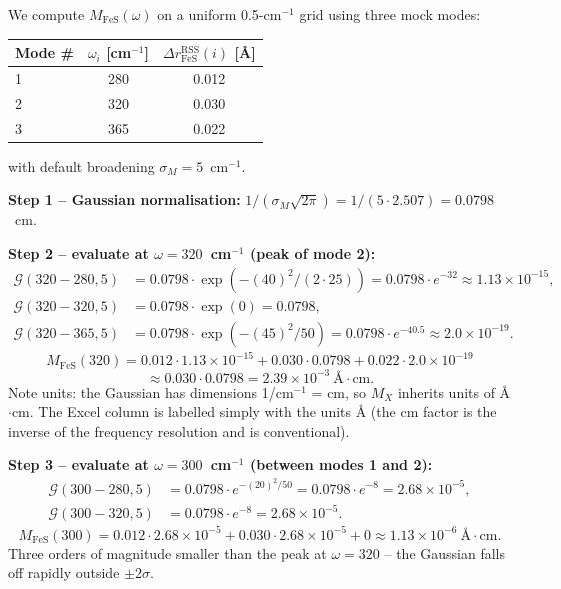 \documentclass[10pt,a4paper,twoside]{article}
\begin{document}
\begin{workedexample}
We compute $M_\text{FeS}(\omega)$ on a uniform 0.5-cm$^{-1}$ grid
using three mock modes:
\begin{center}
\begin{tabular}{lcc}
\toprule
Mode \# & $\omega_i$ [cm$^{-1}$] & $\Delta r^\text{RSS}_\text{FeS}(i)$ [\AA{}] \\
\midrule
1 & 280 & 0.012 \\
2 & 320 & 0.030 \\
3 & 365 & 0.022 \\
\bottomrule
\end{tabular}
\end{center}
with default broadening $\sigma_M = 5$~cm$^{-1}$.

\textbf{Step 1 -- Gaussian normalisation:}
$1/(\sigma_M \sqrt{2\pi}) = 1/(5 \cdot 2.507) = 0.0798$~cm.

\textbf{Step 2 -- evaluate at $\omega = 320$~cm$^{-1}$ (peak of mode 2):}
\begin{align*}
  \mathcal{G}(320-280, 5) &= 0.0798 \cdot \exp(-(40)^2/(2 \cdot 25))
   = 0.0798 \cdot e^{-32} \approx 1.13 \times 10^{-15}, \\
  \mathcal{G}(320-320, 5) &= 0.0798 \cdot \exp(0) = 0.0798, \\
  \mathcal{G}(320-365, 5) &= 0.0798 \cdot \exp(-(45)^2/50)
   = 0.0798 \cdot e^{-40.5} \approx 2.0 \times 10^{-19}.
\end{align*}
\[
  M_\text{FeS}(320) = 0.012 \cdot 1.13 \times 10^{-15}
                   + 0.030 \cdot 0.0798
                   + 0.022 \cdot 2.0 \times 10^{-19}
\]
\[
   \approx 0.030 \cdot 0.0798
   = \boxed{2.39 \times 10^{-3}~\text{\AA{}}\cdot\text{cm}}.
\]
Note units: the Gaussian has dimensions 1/cm$^{-1}$ = cm, so
$M_X$ inherits units of \AA{}$\cdot$cm. The Excel column is
labelled simply with the units \AA{} (the cm factor is the inverse
of the frequency resolution and is conventional).

\textbf{Step 3 -- evaluate at $\omega = 300$~cm$^{-1}$ (between modes 1 and 2):}
\begin{align*}
  \mathcal{G}(300-280, 5) &= 0.0798 \cdot e^{-(20)^2/50}
   = 0.0798 \cdot e^{-8} = 2.68 \times 10^{-5}, \\
  \mathcal{G}(300-320, 5) &= 0.0798 \cdot e^{-8}
   = 2.68 \times 10^{-5}.
\end{align*}
\[
  M_\text{FeS}(300) = 0.012 \cdot 2.68 \times 10^{-5}
                   + 0.030 \cdot 2.68 \times 10^{-5}
                   + 0 \approx 1.13 \times 10^{-6}~\text{\AA{}}\cdot\text{cm}.
\]
Three orders of magnitude smaller than the peak at $\omega = 320$
-- the Gaussian falls off rapidly outside $\pm 2\sigma$.


\end{workedexample}
\end{document}
